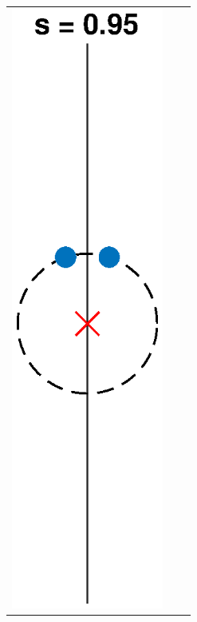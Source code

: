 \documentclass[thesis.tex]{subfiles}
\begin{document}
\begin{figure}[H]
\begin{center}
\begin{tabular}{ccc}
\includegraphics[width=5cm]{images/kreinbubbles/bubble095R} &

\end{tabular}
\end{center}
\end{figure}
\end{document}
